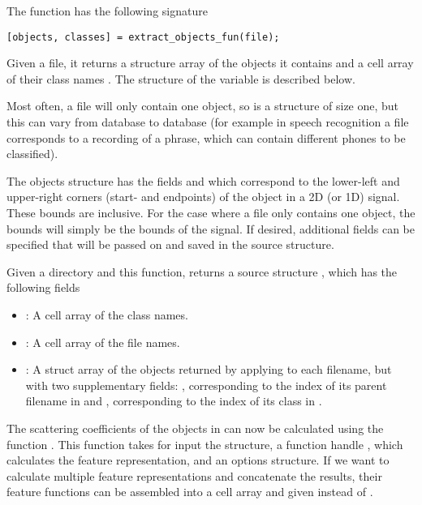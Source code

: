 \documentclass[twocolumn]{article}
\begin{document}
The  function has the following signature
\begin{lstlisting}
[objects, classes] = extract_objects_fun(file);
\end{lstlisting}
Given a file, it returns a structure array  of the objects it contains and a cell array of their class names . The structure of the  variable is described below.

Most often, a file will only contain one object, so  is a  structure of size one, but this can vary from database to database (for example in speech recognition a file corresponds to a recording of a phrase, which can contain different phones to be classified).

The objects structure has the fields  and  which correspond to the lower-left and upper-right corners (start- and endpoints) of the object in a 2D (or 1D) signal. These bounds are inclusive. For the case where a file only contains one object, the bounds will simply be the bounds of the signal. If desired, additional fields can be specified that will be passed on and saved in the source structure.

Given a directory and this function,  returns a source structure , which has the following fields
\begin{itemize}
	\item {}: A cell array of the class names.
	\item {}: A cell array of the file names.
	\item {}: A struct array of the objects returned by applying  to each filename, but with two supplementary fields: , corresponding to the index of its parent filename in  and , corresponding to the index of its class in .
\end{itemize}

The scattering coefficients of the objects in  can now be calculated using the function . This function takes for input the  structure, a function handle , which calculates the feature representation, and an options structure. If we want to calculate multiple feature representations and concatenate the results, their feature functions can be assembled into a cell array and given instead of .
\end{document}
